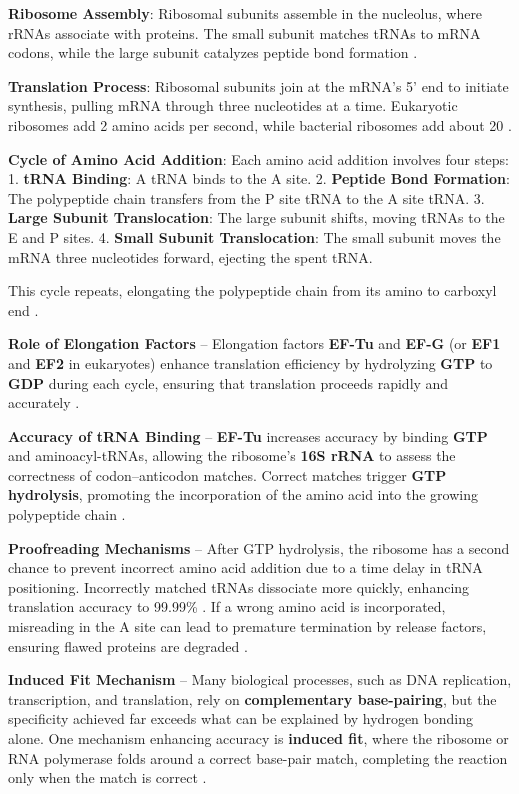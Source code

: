 \textbf{Ribosome Assembly}: Ribosomal subunits assemble in the nucleolus, where rRNAs associate with proteins. The small subunit matches tRNAs to mRNA codons, while the large subunit catalyzes peptide bond formation \cite*{L1-Chapter6}.

\textbf{Translation Process}: Ribosomal subunits join at the mRNA's 5' end to initiate synthesis, pulling mRNA through three nucleotides at a time. Eukaryotic ribosomes add 2 amino acids per second, while bacterial ribosomes add about 20 \cite*{L1-Chapter6}.

\textbf{Cycle of Amino Acid Addition}: Each amino acid addition involves four steps:
1. \textbf{tRNA Binding}: A tRNA binds to the A site.
2. \textbf{Peptide Bond Formation}: The polypeptide chain transfers from the P site tRNA to the A site tRNA.
3. \textbf{Large Subunit Translocation}: The large subunit shifts, moving tRNAs to the E and P sites.
4. \textbf{Small Subunit Translocation}: The small subunit moves the mRNA three nucleotides forward, ejecting the spent tRNA.

This cycle repeats, elongating the polypeptide chain from its amino to carboxyl end \cite*{L1-Chapter6}.


\textbf{Role of Elongation Factors} – Elongation factors \textbf{EF-Tu} and \textbf{EF-G} (or \textbf{EF1} and \textbf{EF2} in eukaryotes) enhance translation efficiency by hydrolyzing \textbf{GTP} to \textbf{GDP} during each cycle, ensuring that translation proceeds rapidly and accurately \cite*{L1-Chapter6}.

\textbf{Accuracy of tRNA Binding} – \textbf{EF-Tu} increases accuracy by binding \textbf{GTP} and aminoacyl-tRNAs, allowing the ribosome's \textbf{16S rRNA} to assess the correctness of codon–anticodon matches. Correct matches trigger \textbf{GTP hydrolysis}, promoting the incorporation of the amino acid into the growing polypeptide chain \cite*{L1-Chapter6}.

\textbf{Proofreading Mechanisms} – After GTP hydrolysis, the ribosome has a second chance to prevent incorrect amino acid addition due to a time delay in tRNA positioning. Incorrectly matched tRNAs dissociate more quickly, enhancing translation accuracy to 99.99\% \cite*{L1-Chapter6}. 
If a wrong amino acid is incorporated, misreading in the A site can lead to premature termination by release factors, ensuring flawed proteins are degraded \cite*{L1-Chapter6}.


\textbf{Induced Fit Mechanism} – Many biological processes, such as DNA replication, transcription, and translation, rely on \textbf{complementary base-pairing}, but the specificity achieved far exceeds what can be explained by hydrogen bonding alone. One mechanism enhancing accuracy is \textbf{induced fit}, where the ribosome or RNA polymerase folds around a correct base-pair match, completing the reaction only when the match is correct \cite*{L1-Chapter6}.

